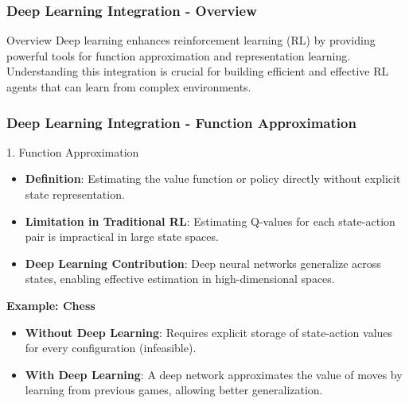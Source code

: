 \documentclass[aspectratio=169]{beamer}
\begin{document}
\begin{frame}[fragile]
    \frametitle{Deep Learning Integration - Overview}
    \begin{block}{Overview}
        Deep learning enhances reinforcement learning (RL) by providing powerful tools for function approximation and representation learning. Understanding this integration is crucial for building efficient and effective RL agents that can learn from complex environments.
    \end{block}
\end{frame}

\begin{frame}[fragile]
    \frametitle{Deep Learning Integration - Function Approximation}
    \begin{block}{1. Function Approximation}
        \begin{itemize}
            \item \textbf{Definition}: Estimating the value function or policy directly without explicit state representation.
            \item \textbf{Limitation in Traditional RL}: Estimating Q-values for each state-action pair is impractical in large state spaces.
            \item \textbf{Deep Learning Contribution}: Deep neural networks generalize across states, enabling effective estimation in high-dimensional spaces.
        \end{itemize}
    \end{block}

    \textbf{Example: Chess} \\
    \begin{itemize}
        \item \textbf{Without Deep Learning}: Requires explicit storage of state-action values for every configuration (infeasible).
        \item \textbf{With Deep Learning}: A deep network approximates the value of moves by learning from previous games, allowing better generalization.
    \end{itemize}
\end{frame}
\end{document}
